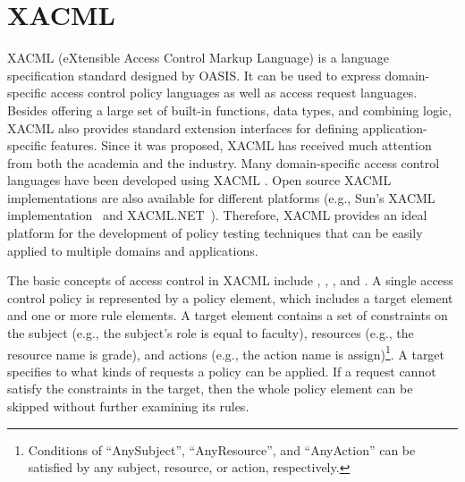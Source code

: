 \section{XACML}
\label{sec:xacml}


 XACML
(eXtensible Access Control Markup Language) is a language
specification standard designed by OASIS. It can be used to express
domain-specific access control policy languages as well as access
request languages. Besides offering a large set of built-in
functions, data types, and combining logic, XACML also provides
standard extension interfaces for defining application-specific
features. Since it was proposed, XACML has received much attention
from both the academia and the industry. Many domain-specific access
control languages have been developed using XACML
\cite{moses03:xacml,lorch03:xacml}. Open source XACML
implementations are also available for different platforms (e.g.,
Sun's XACML implementation~\cite{sun05:xacml} and
XACML.NET~\cite{net05:xacml}). Therefore, XACML provides an ideal
platform for the development of policy testing techniques that can
be easily applied to multiple domains and applications.



The basic concepts of access control in XACML include
, , , and
. A single access control policy is represented by
a policy element, which includes a target element and one or more
rule elements. A target element contains a set of constraints on the
subject (e.g., the subject's role is equal to faculty), resources
(e.g., the resource name is grade), and actions (e.g., the action
name is assign)\footnote{Conditions of ``AnySubject'',
``AnyResource'', and ``AnyAction'' can be satisfied by any subject,
resource, or action, respectively.}. A target specifies to what
kinds of requests a policy can be applied. If a request cannot
satisfy the constraints in the target, then the whole policy element
can be skipped without further examining its rules.


